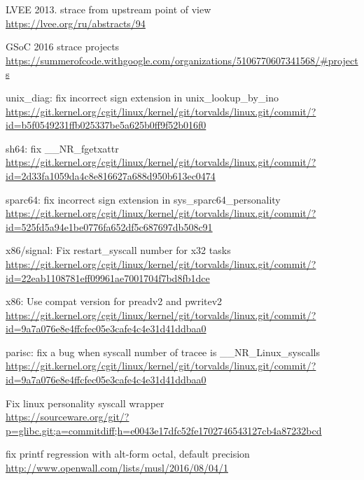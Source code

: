\documentclass[10pt, a5paper]{article}
\begin{document}
\begin{thebibliography}{9}

 LVEE 2013. strace from upstream point of view \\
\url{https://lvee.org/ru/abstracts/94}

 GSoC 2016 strace projects \\
\url{https://summerofcode.withgoogle.com/organizations/5106770607341568/#projects}

 unix\_diag: fix incorrect sign extension in
unix\_lookup\_by\_ino \\
\url{https://git.kernel.org/cgit/linux/kernel/git/torvalds/linux.git/commit/?id=b5f0549231ffb025337be5a625b0ff9f52b016f0}

 sh64: fix \_\_NR\_fgetxattr \\
\url{https://git.kernel.org/cgit/linux/kernel/git/torvalds/linux.git/commit/?id=2d33fa1059da4c8e816627a688d950b613ec0474}

 sparc64: fix incorrect sign extension in
sys\_sparc64\_personality \\
\url{https://git.kernel.org/cgit/linux/kernel/git/torvalds/linux.git/commit/?id=525fd5a94e1be0776fa652df5c687697db508c91}

 x86/signal: Fix restart\_syscall number for x32 tasks \\
\url{https://git.kernel.org/cgit/linux/kernel/git/torvalds/linux.git/commit/?id=22eab1108781eff09961ae7001704f7bd8fb1dce}

 x86: Use compat version for preadv2 and pwritev2 \\
\url{https://git.kernel.org/cgit/linux/kernel/git/torvalds/linux.git/commit/?id=9a7a076e8e4ffcfec05e3cafe4c4e31d41ddbaa0}

 parisc: fix a bug when syscall number of tracee is \_\_NR\_Linux\_syscalls \\
\url{https://git.kernel.org/cgit/linux/kernel/git/torvalds/linux.git/commit/?id=9a7a076e8e4ffcfec05e3cafe4c4e31d41ddbaa0}

 Fix linux personality syscall wrapper \\
\url{https://sourceware.org/git/?p=glibc.git;a=commitdiff;h=e0043e17dfc52fe1702746543127cb4a87232bcd}

 fix printf regression with alt-form octal, default precision \\
\url{http://www.openwall.com/lists/musl/2016/08/04/1}

\end{thebibliography}
\end{document}
